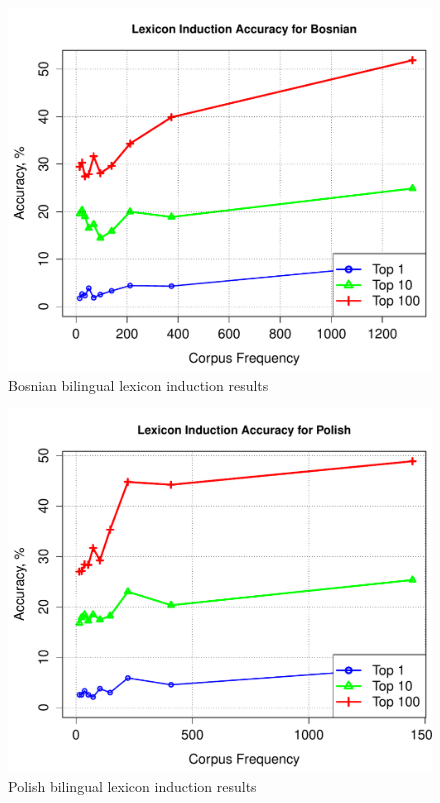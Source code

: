 \documentclass[11pt]{article}
\begin{document}
\begin{figure}
\begin{center}
\includegraphics[width=0.9 \linewidth]{../byFreqGraphs/bs/lexinductnew.pdf}
\vskip -0.15in
\caption{Bosnian bilingual lexicon induction results}
\label{fig:bli.bs} 
\end{center}
\end{figure}



\begin{figure}
\begin{center}
\includegraphics[width=0.9 \linewidth]{../byFreqGraphs/pl/lexinductnew.pdf}
\vskip -0.15in
\caption{Polish bilingual lexicon induction results}
\label{fig:bli.pl} 
\end{center}
\end{figure}
\end{document}
